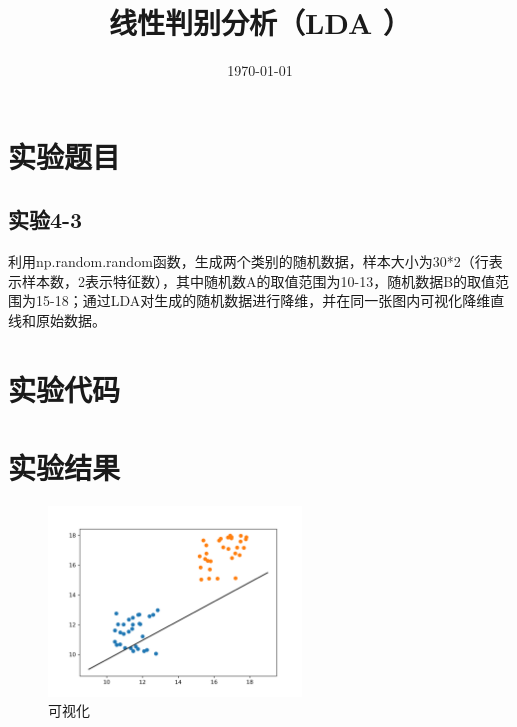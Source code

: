 \documentclass{../source/Experiment}
\title{线性判别分析（LDA
）}
\date{\today}
\begin{document}
\makecover
\section{实验题目}
\subsection{实验4-3}
利用np.random.random函数，生成两个类别的随机数据，样本大小为30*2（行表示样本数，2表示特征数），其中随机数A的取值范围为10-13，随机数据B的取值范围为15-18；通过LDA对生成的随机数据进行降维，并在同一张图内可视化降维直线和原始数据。


\section{实验代码}



\section{实验结果}

\begin{figure}[H]
    \centering
    \includegraphics[width = 0.6\textwidth]{Part4/4-3.png}
    \caption{可视化}
\end{figure}
\end{document}
